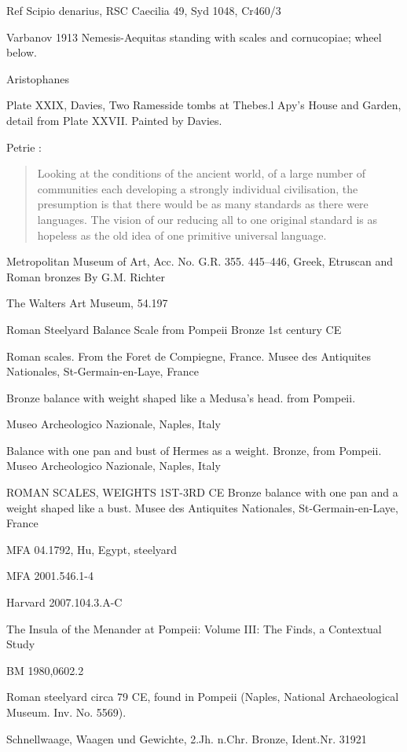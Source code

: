 \documentclass{article}
\begin{document}
Ref Scipio denarius, RSC Caecilia 49, Syd 1048, Cr460/3

Varbanov  1913 Nemesis-Aequitas standing with scales and cornucopiae; wheel below.

Aristophanes


Plate XXIX, Davies, Two Ramesside tombs at Thebes.l
Apy's House and Garden, detail from Plate XXVII.
Painted by Davies.

Petrie \cite[p.~2]{petrie1926}:

\begin{quote}
Looking at the conditions of the ancient world, of a large number of communities 
each developing a strongly individual civilisation, the presumption is that there would be as many
standards as there were languages. The vision of our reducing all to one original standard is as
hopeless as the old idea of one primitive universal language.
\end{quote}

Metropolitan Museum of Art, Acc. No. G.R. 355.
445--446, Greek, Etruscan and Roman bronzes
By G.M. Richter

The Walters Art Museum, 54.197 

Roman Steelyard Balance Scale from Pompeii Bronze 1st century CE

Roman scales. From the Foret de Compiegne, France. Musee des Antiquites Nationales, St-Germain-en-Laye, France

Bronze balance with weight shaped like a Medusa's head. from Pompeii. 

Museo Archeologico Nazionale, Naples, Italy

Balance with one pan and bust of Hermes as a weight. Bronze, from Pompeii. Museo Archeologico Nazionale, Naples, Italy

ROMAN SCALES, WEIGHTS 1ST-3RD CE Bronze balance with one pan and a weight shaped like a bust. Musee des Antiquites Nationales, St-Germain-en-Laye, France

MFA 04.1792, Hu, Egypt, steelyard

MFA 2001.546.1-4

Harvard 2007.104.3.A-C

The Insula of the Menander at Pompeii: Volume III: The Finds, a Contextual Study

BM 1980,0602.2

Roman steelyard circa 79 CE, found in
Pompeii (Naples, National Archaeological
Museum. Inv. No. 5569).

Schnellwaage, Waagen und Gewichte, 2.Jh. n.Chr. Bronze, Ident.Nr. 31921
\end{document}

